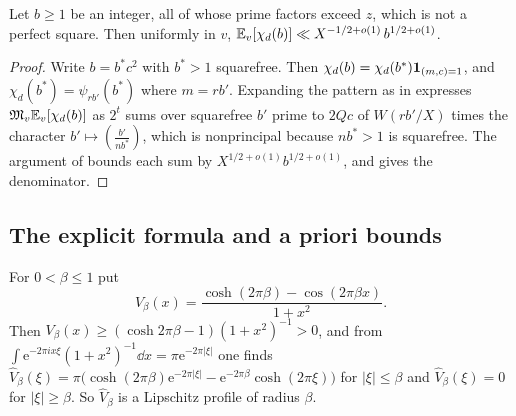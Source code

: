 \documentclass[11pt,colorlinks]{charlie}
\newcommand{\e}{\mathrm{e}}
\begin{document}
\begin{lemma}\label{lem:charmean}
Let $b\ge1$ be an integer, all of whose prime factors exceed $z$, which is not a perfect square. Then uniformly in $v$,
$\mathbb{E}_v[\chi_d(b)]\ll X^{-1/2+o(1)}\,b^{1/2+o(1)}$.
\end{lemma}
\begin{proof}
Write $b=b^*c^2$ with $b^*>1$ squarefree. Then $\chi_d(b)=\chi_d(b^*)\mathbf{1}_{(m,c)=1}$, and $\chi_d(b^*)=\psi_{rb'}(b^*)$ where $m=rb'$. Expanding the pattern as in  expresses $\mathfrak M_v\mathbb{E}_v[\chi_d(b)]$ as $2^t$ sums over squarefree $b'$ prime to $2Qc$ of $W(rb'/X)$ times the character $b'\mapsto(\tfrac{b'}{nb^*})$, which is nonprincipal because $nb^*>1$ is squarefree. The argument of  bounds each sum by $X^{1/2+o(1)}b^{1/2+o(1)}$, and  gives the denominator.
\end{proof}

\subsection{The explicit formula and a priori bounds}
For $0<\beta\le1$ put
\[
 V_\beta(x)=\frac{\cosh(2\pi\beta)-\cos(2\pi\beta x)}{1+x^2}.
\]
Then $V_\beta(x)\ge(\cosh2\pi\beta-1)(1+x^2)^{-1}>0$, and from $\int\e^{-2\pi ix\xi}(1+x^2)^{-1}\dd x=\pi\e^{-2\pi|\xi|}$ one finds $\widehat V_\beta(\xi)=\pi\big(\cosh(2\pi\beta)\e^{-2\pi|\xi|}-\e^{-2\pi\beta}\cosh(2\pi\xi)\big)$ for $|\xi|\le\beta$ and $\widehat V_\beta(\xi)=0$ for $|\xi|\ge\beta$. So $\widehat V_\beta$ is a Lipschitz profile of radius $\beta$.
\end{document}
